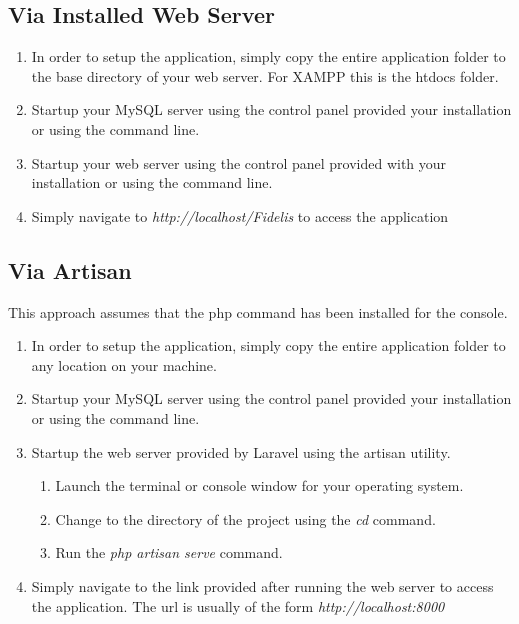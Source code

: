 \documentclass[12pt]{article}
\begin{document}
\subsection{Via Installed Web Server}
\begin{enumerate}
	\item In order to setup the application, simply copy the entire application folder to the base directory of your web server. For XAMPP this is the htdocs folder.
	\item Startup your MySQL server using the control panel provided your installation or using the command line.
	\item Startup your web server using the control panel provided with your installation or using the command line.
	\item Simply navigate to \emph{http://localhost/Fidelis} to access the application
\end{enumerate}

\subsection{Via Artisan}
This approach assumes that the php command has been installed for the console.
\begin{enumerate}
	\item In order to setup the application, simply copy the entire application folder to any location on your machine.
	\item Startup your MySQL server using the control panel provided your installation or using the command line.
	\item Startup the web server provided by Laravel using the artisan utility.
	\begin{enumerate}
		\item Launch the terminal or console window for your operating system.
		\item Change to the directory of the project using the \emph{cd} command.
		\item Run the \emph{php artisan serve} command.
	\end{enumerate}
	\item Simply navigate to the link provided after running the web server to access the application. The url is usually of the form \emph{http://localhost:8000}
\end{enumerate}
\end{document}
